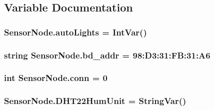 \subsection{Variable Documentation}
\subsubsection[{\texorpdfstring{auto\+Lights}{autoLights}}]{\setlength{\rightskip}{0pt plus 5cm}Sensor\+Node.\+auto\+Lights = Int\+Var()}\hypertarget{namespaceSensorNode_ae221b94a7568f6a4eec4ed916d6d9fbb}{}\label{namespaceSensorNode_ae221b94a7568f6a4eec4ed916d6d9fbb}
\subsubsection[{\texorpdfstring{bd\+\_\+addr}{bd_addr}}]{\setlength{\rightskip}{0pt plus 5cm}string Sensor\+Node.\+bd\+\_\+addr = \textquotesingle{}98\+:D3\+:31\+:\+F\+B\+:31\+:\+A6\textquotesingle{}}\hypertarget{namespaceSensorNode_a37cb27925dc2a29cf8e92032d08246d7}{}\label{namespaceSensorNode_a37cb27925dc2a29cf8e92032d08246d7}
\subsubsection[{\texorpdfstring{conn}{conn}}]{\setlength{\rightskip}{0pt plus 5cm}int Sensor\+Node.\+conn = 0}\hypertarget{namespaceSensorNode_ada87615462c1a9ae3b690316d00d0540}{}\label{namespaceSensorNode_ada87615462c1a9ae3b690316d00d0540}
\subsubsection[{\texorpdfstring{D\+H\+T22\+Hum\+Unit}{DHT22HumUnit}}]{\setlength{\rightskip}{0pt plus 5cm}Sensor\+Node.\+D\+H\+T22\+Hum\+Unit = String\+Var()}\hypertarget{namespaceSensorNode_ac12964b10f125bd3256f2b57afb1eaff}{}\label{namespaceSensorNode_ac12964b10f125bd3256f2b57afb1eaff}
